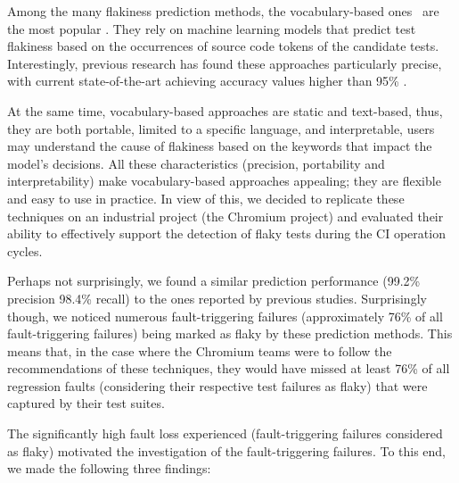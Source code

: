 Among the many flakiness prediction methods, the vocabulary-based ones~\cite{Haben2021,Pinto2020,Camara2021VocabExtendedReplication,Bertolino2020,olewickiBrown} are the most popular \cite{Parry2021}. They rely on machine learning models that predict test flakiness based on the occurrences of source code tokens of the candidate tests. Interestingly, previous research has found these approaches particularly precise, with current state-of-the-art achieving accuracy values higher than 95\% \cite{Pinto2020,fatima2021flakify,camara2021use,Camara2021VocabExtendedReplication,Haben2021}. 

At the same time, vocabulary-based approaches are static and text-based, thus, they are both portable, \ie limited to a specific language, and interpretable, \ie users may understand the cause of flakiness based on the keywords that impact the model's decisions. All these characteristics (precision, portability and interpretability) make vocabulary-based approaches appealing; they are flexible and easy to use in practice. In view of this, we decided to replicate these techniques on an industrial project (the Chromium project) and evaluated their ability to effectively support the detection of flaky tests during the CI operation cycles.

Perhaps not surprisingly, we found a similar prediction performance (99.2\% precision 98.4\% recall) to the ones reported by previous studies. Surprisingly though, we noticed numerous fault-triggering failures (approximately 76\% of all fault-triggering failures) being marked as flaky by these prediction methods. This means that, in the case where the Chromium teams were to follow the recommendations of these techniques, they would have missed at least 76\% of all regression faults (considering their respective test failures as flaky) that were captured by their test suites. 

The significantly high fault loss experienced (fault-triggering failures considered as flaky) motivated the investigation of the fault-triggering failures. To this end, we made the following three findings: 

